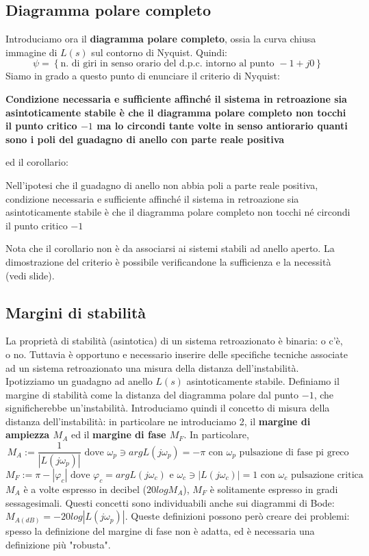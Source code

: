 \documentclass[11pt]{article}
\begin{document}
\subsection{Diagramma polare completo}
Introduciamo ora il \textbf{diagramma polare completo}, ossia la curva chiusa immagine di $L(s)$ sul contorno di Nyquist. Quindi:
\begin{displaymath}
    \psi = \left\{\textrm{n. di giri in senso orario del d.p.c. intorno al punto }-1+j0\right\}
\end{displaymath}
Siamo in grado a questo punto di enunciare il criterio di Nyquist:
\begin{center}
    \textbf{Condizione necessaria e sufficiente affinché il sistema in retroazione sia asintoticamente stabile è che il diagramma polare completo non tocchi il punto critico $-1$ ma lo circondi tante volte in senso antiorario quanti sono i poli del guadagno di anello con parte reale positiva}
\end{center}
ed il corollario:
\begin{center}
    Nell'ipotesi che il guadagno di anello non abbia poli a parte reale positiva, condizione necessaria e sufficiente affinché il sistema in retroazione sia asintoticamente stabile è che il diagramma polare completo non tocchi né circondi il punto critico $-1$
\end{center}
Nota che il corollario non è da associarsi ai sistemi stabili ad anello aperto. La dimostrazione del criterio è possibile verificandone la sufficienza e la necessità (vedi slide).
\subsection{Margini di stabilità}
La proprietà di stabilità (asintotica) di un sistema retroazionato è binaria: o c'è, o no. Tuttavia è opportuno e necessario inserire delle specifiche tecniche associate ad un sistema retroazionato una misura della distanza dell'instabilità. Ipotizziamo un guadagno ad anello $L(s)$ asintoticamente stabile. Definiamo il margine di stabilità come la distanza del diagramma polare dal punto $-1$, che significherebbe un'instabilità. Introduciamo quindi il concetto di misura della distanza dell'instabilità: in particolare ne introduciamo 2, il \textbf{margine di ampiezza $M_A$} ed il \textbf{margine di fase $M_F$}. In particolare, 
\begin{displaymath}
    M_A := \frac{1}{|L(j\omega_p)|} \textrm{ dove }\omega_p \ni argL(j\omega_p)=-\pi \textrm{ con }\omega_p\textrm{ pulsazione di fase pi greco}
\end{displaymath}
\begin{displaymath}
    M_F := \pi - |\varphi_c| \textrm{ dove }\varphi_c=argL(j\omega_c) \textrm{ e } \omega_c \ni |L(j\omega_c)|=1\textrm{ con }\omega_c\textrm{ pulsazione critica}
\end{displaymath}
$M_A$ è a volte espresso in decibel ($20logM_A$), $M_F$ è solitamente espresso in gradi sessagesimali. 
Questi concetti sono individuabili anche sui diagrammi di Bode: $M_{A(dB)} = -20log|L(j\omega_p)|$.
Queste definizioni possono però creare dei problemi: spesso la definizione del margine di fase non è adatta, ed è necessaria una definizione più "robusta".
\end{document}
